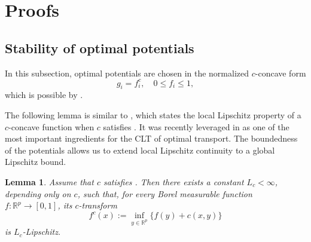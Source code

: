 \documentclass{amsart}
\theoremstyle{plain}
\numberwithin{equation}{section}\newtheorem{theorem}{Theorem}[section]
\newtheorem{lemma}[theorem]{Lemma}
\theoremstyle{remark}
\begin{document}
\section{Proofs}\label{sec:proofs}

\subsection{Stability of optimal potentials}\label{subsec: stability of optimal potentials}


In this subsection, optimal potentials are chosen in the normalized
$c$-concave form
\[
    g_i=f_i^c,
    \quad 0\leq f_i\leq1,
\]
which is possible by .



The following lemma is similar to \cite[Theorem 3.3]{gangbo1996geometry}, which states the local Lipschitz property of a $c$-concave function when $c$ satisfies . It was recently leveraged in \cite[Lemma 2.3]{CLT_general_transport2024} as one of the most important ingredients for the CLT of optimal transport. The boundedness of the potentials allows us to extend local Lipschitz continuity to a global Lipschitz bound.




\begin{lemma}
\label{lem: uniform regularity of potentials}
Assume that $c$ satisfies
.
Then there exists a constant $L_c<\infty$, depending only on $c$,
such that, for every Borel measurable function
$f:\mathbb R^p\to[0,1]$, its $c$-transform
\[
    f^c(x)
    :=
    \inf_{y\in\mathbb R^p}
    \{f(y)+c(x,y)\}
\]
is $L_c$-Lipschitz.
\end{lemma}
\end{document}

